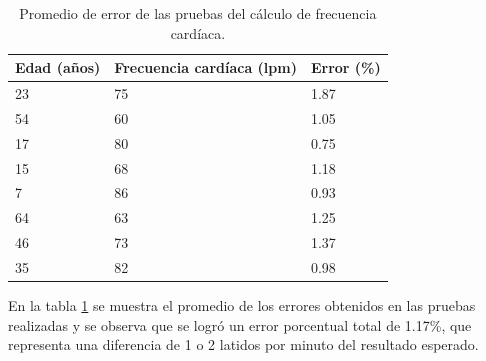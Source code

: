 \begin{table}[htbp]
	\begin{center}
		\begin{tabular}{|l|l|l|}
			\hline
			\textbf{Edad (años)} & \textbf{Frecuencia cardíaca (lpm)} & \textbf{Error (\%)} \\
			\hline \hline
			23 & 75 & 1.87 \\
			\hline
			54 & 60 & 1.05 \\
			\hline
			17 & 80 & 0.75 \\
			\hline
			15 & 68 & 1.18\\
			\hline
			7 & 86 & 0.93 \\
			\hline
			64 & 63 & 1.25 \\
			\hline
			46 & 73 & 1.37 \\
			\hline
			35 & 82 & 0.98 \\
			\hline
		\end{tabular}
		\caption{Promedio de error de las pruebas del cálculo de frecuencia cardíaca.}
		\label{sensorPulso:promedioError}
	\end{center}
\end{table}

En la tabla \ref{sensorPulso:promedioError} se muestra el promedio de los errores obtenidos en las pruebas realizadas y se observa que se logró un error porcentual total de 1.17\%, que representa una diferencia de 1 o 2 latidos por minuto del resultado esperado.